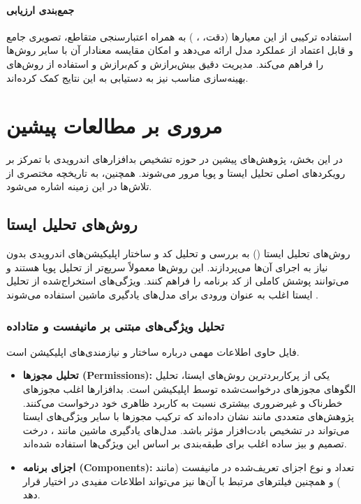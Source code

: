 \paragraph{جمع‌بندی ارزیابی}
استفاده ترکیبی از این معیارها (دقت، ، ) به همراه اعتبارسنجی متقاطع، تصویری جامع و قابل اعتماد از عملکرد مدل  ارائه می‌دهد و امکان مقایسه معنادار آن با سایر روش‌ها را فراهم می‌کند. مدیریت دقیق بیش‌برازش و کم‌برازش و استفاده از روش‌های بهینه‌سازی مناسب نیز به دستیابی به این نتایج کمک کرده‌اند.

\section{مروری بر مطالعات پیشین}
در این بخش، پژوهش‌های پیشین در حوزه تشخیص بدافزارهای اندرویدی با تمرکز بر رویکردهای اصلی تحلیل ایستا و پویا مرور می‌شوند. همچنین، به تاریخچه مختصری از تلاش‌ها در این زمینه اشاره می‌شود.

\subsection{روش‌های تحلیل ایستا}
روش‌های تحلیل ایستا () به بررسی و تحلیل کد و ساختار اپلیکیشن‌های اندرویدی بدون نیاز به اجرای آن‌ها می‌پردازند. این روش‌ها معمولاً سریع‌تر از تحلیل پویا هستند و می‌توانند پوشش کاملی از کد برنامه را فراهم کنند. ویژگی‌های استخراج‌شده از تحلیل ایستا اغلب به عنوان ورودی برای مدل‌های یادگیری ماشین استفاده می‌شوند \cite{AndroidMalwareSurvey}.

\subsubsection{تحلیل ویژگی‌های مبتنی بر مانیفست و متاداده}
فایل  حاوی اطلاعات مهمی درباره ساختار و نیازمندی‌های اپلیکیشن است.
\begin{itemize}
    \item \textbf{تحلیل مجوزها (Permissions):} یکی از پرکاربردترین روش‌های ایستا، تحلیل الگوهای مجوزهای درخواست‌شده توسط اپلیکیشن است. بدافزارها اغلب مجوزهای خطرناک و غیرضروری بیشتری نسبت به کاربرد ظاهری خود درخواست می‌کنند. پژوهش‌های متعددی مانند  \cite{Drebin} نشان داده‌اند که ترکیب مجوزها با سایر ویژگی‌های ایستا می‌تواند در تشخیص بادت‌افزار مؤثر باشد. مدل‌های یادگیری ماشین مانند ، درخت تصمیم و بیز ساده اغلب برای طبقه‌بندی بر اساس این ویژگی‌ها استفاده شده‌اند.
    \item \textbf{اجزای برنامه (Components):} تعداد و نوع اجزای تعریف‌شده در مانیفست (مانند ) و همچنین فیلترهای  مرتبط با آن‌ها نیز می‌تواند اطلاعات مفیدی در اختیار قرار دهد.
\end{itemize}


